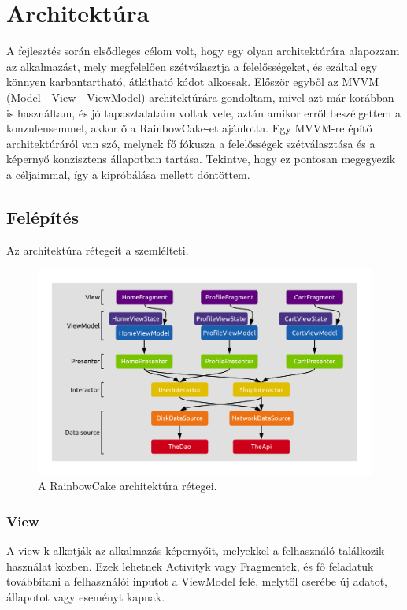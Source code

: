 \chapter{Architektúra}

A fejlesztés során elsődleges célom volt, hogy egy olyan architektúrára alapozzam az alkalmazást, mely megfelelően szétválasztja a felelősségeket, és ezáltal egy könnyen karbantartható, átlátható kódot alkossak. Először egyből az MVVM (Model - View - ViewModel) architektúrára gondoltam, mivel azt már korábban is használtam, és jó tapasztalataim voltak vele, aztán amikor erről beszélgettem a konzulensemmel, akkor ő a RainbowCake-et\cite{Rainbowcake} ajánlotta. Egy MVVM-re építő architektúráról van szó, melynek fő fókusza a felelősségek szétválasztása és a képernyő konzisztens állapotban tartása. Tekintve, hogy ez pontosan megegyezik a céljaimmal, így a kipróbálása mellett döntöttem.

\section{Felépítés}

Az architektúra rétegeit a  szemlélteti.

\begin{figure}[!ht]
	\centering
	\includegraphics[width=150mm, keepaspectratio]{figures/final-architecture.png}
	\caption{A RainbowCake architektúra rétegei.}
	\label{fig:RainbowCakeLayers}
\end{figure}

\subsection{View}
A view-k alkotják az alkalmazás képernyőit, melyekkel a felhasználó találkozik használat közben. Ezek lehetnek Activityk vagy Fragmentek, és fő feladatuk továbbítani a felhasználói inputot a ViewModel felé, melytől cserébe új adatot, állapotot vagy eseményt kapnak. 

